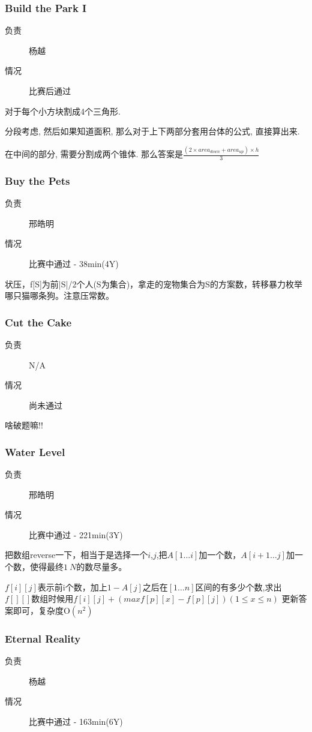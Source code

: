 \documentclass[a4paper, 11pt, nofonts, nocap, fancyhdr]{ctexart}
\newcommand{\problem}[1]{\subsubsection{#1}}
\begin{document}
\problem{Build the Park I}

\begin{description}
\item[负责] 杨越
\item[情况] 比赛后通过
\end{description}

对于每个小方块割成4个三角形.

分段考虑, 然后如果知道面积, 那么对于上下两部分套用台体的公式, 直接算出来.

在中间的部分, 需要分割成两个锥体. 那么答案是$\frac{(2\times area_{down}+area_{up})\times h}{3}$

\problem{Buy the Pets}

\begin{description}
\item[负责] 邢皓明
\item[情况] 比赛中通过 - 38min(4Y)
\end{description}

状压，f[S]为前|S|/2个人(S为集合)，拿走的宠物集合为S的方案数，转移暴力枚举哪只猫哪条狗。注意压常数。

\problem{Cut the Cake}

\begin{description}
\item[负责] N/A
\item[情况] 尚未通过
\end{description}

啥破题嘛!!

\problem{Water Level}

\begin{description}
\item[负责] 邢皓明
\item[情况] 比赛中通过 - 221min(3Y)
\end{description}

把数组reverse一下，相当于是选择一个$i$,$j$,把$A[1 \dots i]$加一个数，$A[i+1 \dots j]$加一个数，使得最终$1~N$的数尽量多。

$f[i][j]$表示前i个数，加上$1 - A[j]$之后在$[1 \dots n]$区间的有多少个数,求出$f[][]$数组时候用$f[i][j] + (max{f[p][x]} - f[p][j])(1\leq x \leq n)$ 更新答案即可，复杂度O$(n^2)$

\problem{Eternal Reality}

\begin{description}
\item[负责] 杨越
\item[情况] 比赛中通过 - 163min(6Y)
\end{description}
\end{document}
